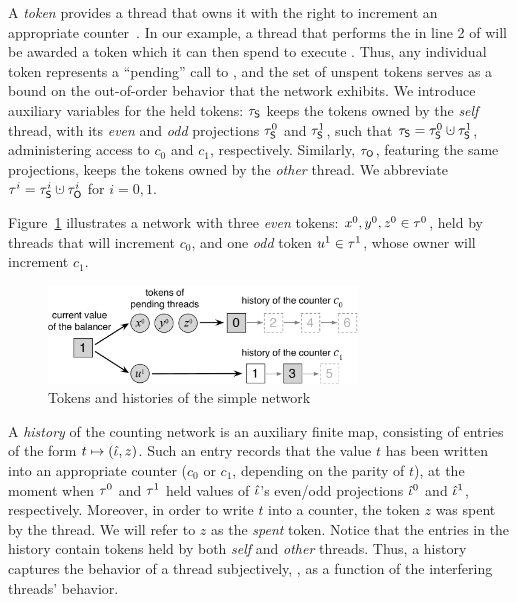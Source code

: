 A \emph{token} provides a thread that owns it with the right to
increment an appropriate counter~\cite{Aspnes-al:JACM94}. In our
example, a thread that performs the  in line 2 of
 will be awarded a token which it can then spend to
execute .
%
Thus, any individual token represents a ``pending'' call to
, and the set of unspent tokens serves as a bound on
the out-of-order behavior that the network exhibits. We introduce
auxiliary variables for the held tokens: $\tau_{\mathsf{S}}$ keeps the tokens
owned by the \emph{self} thread, with its \emph{even} and \emph{odd}
projections $\tau_{\mathsf{S}}^0$ and $\tau_{\mathsf{S}}^1$, such that $\tkns = \tkns^0
\hunion \tkns^1$, administering access to $c_0$ and $c_1$,
respectively. Similarly, $\tau_{\mathsf{O}}$, featuring the same projections,
keeps the tokens owned by the \emph{other} thread.  We abbreviate
$\tkn^i = \tkns^i \hunion \tkno^i$ for $i=0,1$.  
%
%

Figure~\ref{fig:chist} illustrates a network with three \emph{even}
tokens: $x^0, y^0, z^0 \in \tau^0$, held by threads that will
increment $c_0$, and one \emph{odd} token $u^1 \in \tau^1$, whose
owner will increment $c_1$.
%

{
\setlength{\belowcaptionskip}{-15pt} 
\begin{figure}
\centering
\includegraphics[width=8.2cm]{chist.pdf}      
\caption{Tokens and histories of the simple network}
\label{fig:chist}
\end{figure}
}

A \emph{history} of the counting network is an auxiliary finite map,
consisting of entries of the form $t \mapsto (\hat{\iota}, z)$.  Such an
entry records that the value $t$ has been written into an appropriate
counter ($c_0$ or $c_1$, depending on the parity of $t$), at the
moment when $\tau^0$ and $\tau^1$ held values of $\hat{\iota}$'s even/odd
projections $\hat{\iota}^0$ and $\hat{\iota}^1$, respectively. Moreover, in order
to write $t$ into a counter, the token $z$ was spent by the thread. We
will refer to $z$ as the \emph{spent} token. Notice that the entries
in the history contain tokens held by both \emph{self} and
\emph{other} threads. Thus, a history captures the behavior of a
thread subjectively, \ie, as a function of the interfering threads'
behavior.

